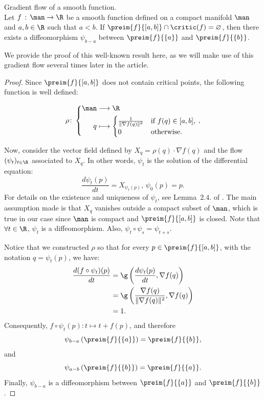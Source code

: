 \begin{lemma}{Gradient flow of a smooth function.}\label{lem:flow}\\
Let $f\,:\,\man\rightarrow \R$ be a smooth function defined on a compact manifold $\man$ and $a,b\in\R$ such that $a<b$.
If $\preim{f}{[a,b]}\cap \critic(f)=\varnothing$,
then there exists a diffeomorphism $\psi_{b-a}$ between $\preim{f}{\{a\}}$ and $\preim{f}{\{b\}}$.

\end{lemma}
We provide the proof of this well-known result here, as we will make use of this gradient flow several times later in the article. 
\begin{proof}
Since $\preim{f}{[a,b]}$ does not contain critical points, the following function is well defined:

$$\rho\colon \left \{
\begin{aligned}
\man  &\longrightarrow \R\\
q &\longmapsto \begin{cases}
\frac{1}{\Vert\nabla f(q)\Vert^2}& \text{if } f(q)\in [a,b],\\
0& \text{otherwise.}
\end{cases}
\end{aligned}
\right.,
$$

Now, consider the vector field defined by $X_q=\rho(q)\cdot\nabla f(q)$ and the flow $(\psi_t)_{t\in\R}$ associated to $X_q$. In other words, $\psi_t$ is the solution of the differential equation: 
$$\frac{d\psi_t(p)}{dt}=X_{\psi_t(p)},\,\psi_0(p)=p.$$
For details on the existence and uniqueness of $\psi_t$, see Lemma~$2.4.$ of \cite{milnor1963morse}. The main assumption made is that $X_q$ vanishes outside a compact subset of $\man$, which is true in our case since $\man$ is compact and $\preim{f}{[a,b]}$ is closed. Note that $\forall t\in\R$, $\psi_t$ is a diffeomorphism. Also, $\psi_t\circ\psi_s=\psi_{t+s}$.

Notice that we constructed $\rho$ so that for every $p\in \preim{f}{[a,b]}$, with the notation $q=\psi_t(p)$, we have:
\begin{align*}
\frac{d(f\circ\psi_t)(p)}{dt}&=\g\left(\frac{d\psi_t(p)}{dt},\nabla f(q)\right)\\
&=\g\left(\frac{\nabla f(q)}{\Vert\nabla f(q)\Vert^2},\nabla f(q)\right)\\
&=1.
\end{align*}
Consequently, $f\circ\psi_t(p)\colon t\mapsto t+f(p)$, and therefore $$\psi_{b-a}\left(\preim{f}{\{a\}}\right)= \preim{f}{\{b\}},$$
and 
$$\psi_{a-b}\left(\preim{f}{\{b\}}\right)= \preim{f}{\{a\}}.$$
Finally, $\psi_{b-a}$ is a diffeomorphism between $\preim{f}{\{a\}}$ and $\preim{f}{\{b\}}$.

\end{proof}

